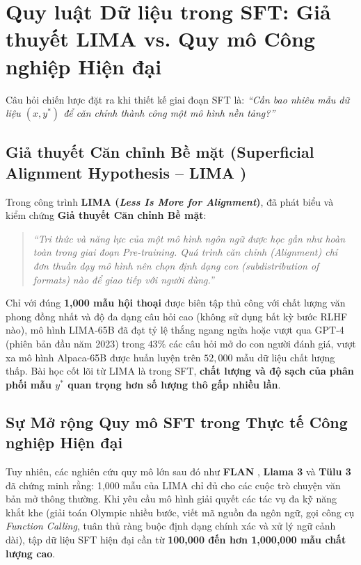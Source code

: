 \section{Quy luật Dữ liệu trong SFT: Giả thuyết LIMA vs. Quy mô Công nghiệp Hiện đại}
\label{sec:lima_vs_scaling}

Câu hỏi chiến lược đặt ra khi thiết kế giai đoạn SFT là: \textit{``Cần bao nhiêu mẫu dữ liệu $(x, y^*)$ để căn chỉnh thành công một mô hình nền tảng?''}

\subsection{Giả thuyết Căn chỉnh Bề mặt (Superficial Alignment Hypothesis -- LIMA \citep{zhou2023lima})}
Trong công trình \textbf{LIMA (\textit{Less Is More for Alignment})}, \citet{zhou2023lima} đã phát biểu và kiểm chứng \textbf{Giả thuyết Căn chỉnh Bề mặt}:
\begin{quote}
\textit{``Tri thức và năng lực của một mô hình ngôn ngữ được học gần như hoàn toàn trong giai đoạn Pre-training. Quá trình căn chỉnh (Alignment) chỉ đơn thuần dạy mô hình nên chọn định dạng con (subdistribution of formats) nào để giao tiếp với người dùng.''}
\end{quote}
Chỉ với đúng \textbf{1,000 mẫu hội thoại} được biên tập thủ công với chất lượng văn phong đồng nhất và độ đa dạng câu hỏi cao (không sử dụng bất kỳ bước RLHF nào), mô hình LIMA-65B đã đạt tỷ lệ thắng ngang ngửa hoặc vượt qua GPT-4 (phiên bản đầu năm 2023) trong $43\%$ các câu hỏi mở do con người đánh giá, vượt xa mô hình Alpaca-65B được huấn luyện trên $52,000$ mẫu dữ liệu chất lượng thấp. Bài học cốt lõi từ LIMA là trong SFT, \textbf{chất lượng và độ sạch của phân phối mẫu $y^*$ quan trọng hơn số lượng thô gấp nhiều lần}.

\subsection{Sự Mở rộng Quy mô SFT trong Thực tế Công nghiệp Hiện đại \citep{dubey2024llama, lambert2024tulu}}
Tuy nhiên, các nghiên cứu quy mô lớn sau đó như \textbf{FLAN} \citep{wei2021finetuned}, \textbf{Llama 3} \citep{dubey2024llama} và \textbf{Tülu 3} \citep{lambert2024tulu} đã chứng minh rằng: 1,000 mẫu của LIMA chỉ đủ cho các cuộc trò chuyện văn bản mở thông thường. Khi yêu cầu mô hình giải quyết các tác vụ đa kỹ năng khắt khe (giải toán Olympic nhiều bước, viết mã nguồn đa ngôn ngữ, gọi công cụ \textit{Function Calling}, tuân thủ ràng buộc định dạng chính xác và xử lý ngữ cảnh dài), tập dữ liệu SFT hiện đại cần từ \textbf{100,000 đến hơn 1,000,000 mẫu chất lượng cao}.


